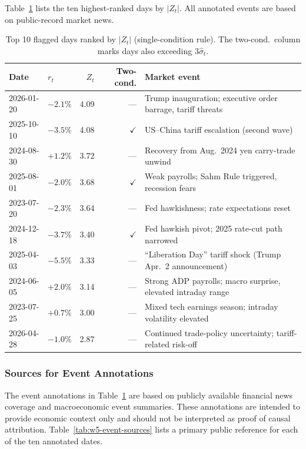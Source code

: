\documentclass[11pt,a4paper]{article}
\begin{document}
Table~\ref{tab:major-jumps} lists the ten highest-ranked days by $|Z_t|$. All annotated events are based on public-record market news.

\begin{table}[H]
\centering
\caption{Top 10 flagged days ranked by $|Z_t|$ (single-condition rule). The two-cond.\ column marks days also exceeding $3\hat{\sigma}_t$.}
\label{tab:major-jumps}
\small
\begin{tabular}{llrrl}
\toprule
Date & $r_t$ & $Z_t$ & Two-cond. & Market event \\
\midrule
2026-01-20 & $-2.1\%$ & 4.09 & ---         & Trump inauguration; executive order barrage, tariff threats \\
2025-10-10 & $-3.5\%$ & 4.08 & $\checkmark$ & US--China tariff escalation (second wave) \\
2024-08-30 & $+1.2\%$ & 3.72 & ---         & Recovery from Aug.\ 2024 yen carry-trade unwind \\
2025-08-01 & $-2.0\%$ & 3.68 & $\checkmark$ & Weak payrolls; Sahm Rule triggered, recession fears \\
2023-07-20 & $-2.3\%$ & 3.64 & ---         & Fed hawkishness; rate expectations reset \\
2024-12-18 & $-3.7\%$ & 3.40 & $\checkmark$ & Fed hawkish pivot; 2025 rate-cut path narrowed \\
2025-04-03 & $-5.5\%$ & 3.33 & ---         & ``Liberation Day'' tariff shock (Trump Apr.\ 2 announcement) \\
2024-06-05 & $+2.0\%$ & 3.14 & ---         & Strong ADP payrolls; macro surprise, elevated intraday range \\
2023-07-25 & $+0.7\%$ & 3.00 & ---         & Mixed tech earnings season; intraday volatility elevated \\
2026-04-28 & $-1.0\%$ & 2.87 & ---         & Continued trade-policy uncertainty; tariff-related risk-off \\
\bottomrule
\end{tabular}
\end{table}

\subsubsection{Sources for Event Annotations}
\label{subsubsec:event-annotation-sources}

The event annotations in Table~\ref{tab:major-jumps} are based on publicly available financial news coverage and macroeconomic event summaries. These annotations are intended to provide economic context only and should not be interpreted as proof of causal attribution. Table~\ref{tab:w5-event-sources} lists a primary public reference for each of the ten annotated dates.
\end{document}
